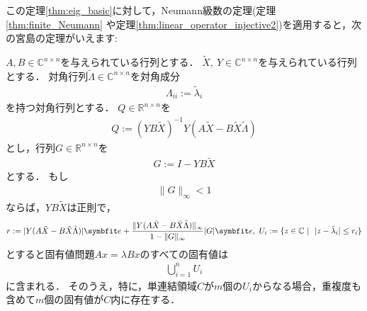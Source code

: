 この定理\ref{thm:eig_basic}に対して，Neumann級数の定理(定理\ref{thm:finite_Neumann} や定理\ref{thm:linear_operator_injective2})を適用すると，次の宮島の定理がいえます:
\begin{Thm} \label{thm:eig_miyajima}
	$A, B \in {\mathbb C}^{n \times n}$を与えられている行列とする．
	$\tilde{X}, ~ Y \in {\mathbb C}^{n \times n}$を与えられている行列とする．
	対角行列$\tilde{\Lambda} \in {\mathbb C}^{n \times n}$を対角成分
	\begin{align*}
		\Lambda_{ii} := \tilde{\lambda}_i
	\end{align*}
	を持つ対角行列とする．
	$Q \in {\mathbb R}^{n \times n}$を
	\begin{align*}
		Q := (Y B \tilde{X})^{-1} Y ( A \tilde{X} - B \tilde{X} \tilde{\Lambda} )
	\end{align*}
	とし，行列$G \in {\mathbb R}^{n \times n}$を
	\begin{align*}
		G := I - Y B \tilde{X} 
	\end{align*}
	とする．
	もし
	\begin{align*}
		\| G \|_{\infty} < 1
	\end{align*}
	ならば，$Y B \tilde{X} $は正則で，
	\begin{align*}
		r :=  | Y ( A \tilde{X} - B \tilde{X} \tilde{\Lambda} ) | \vector{e} +  \frac{ \| Y ( A \tilde{X} - B \tilde{X} \tilde{\Lambda} ) \|_{\infty} }{1 - \| G \|_{\infty}}| G | \vector{e}, ~ U_i := \{ z \in {\mathbb C} ~|~~ | z - \tilde{\lambda}_i | \le r_i  \}
	\end{align*}
	とすると固有値問題$A x = \lambda B x$のすべての固有値は
	\begin{align*}
		\bigcup_{i = 1}^{n} U_i
	\end{align*}
	に含まれる．
	そのうえ，特に，単連結領域$C$が$m$個の$U_i$からなる場合，重複度も含めて$m$個の固有値が$C$内に存在する．
\end{Thm}

